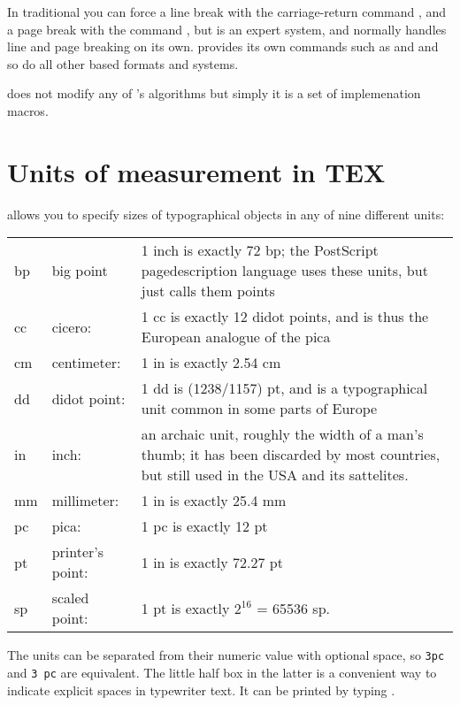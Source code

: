 In traditional \tex you  can force a line break with the carriage-return command ,
and a page break with the command , but \tex is an expert system,
and normally handles line and page breaking on its own. \latex provides its own commands such as \cmd{\clearpage} and \cmd{\newpage} and so do all other \tex based formats and systems.

\latex does not modify any of \tex's algorithms but simply it is a set of implemenation
macros.

\section{Units of measurement in TEX}

\tex allows you to specify sizes of typographical objects in any of nine different
units:


\begin{table}[htbp]
\begin{center}
\begin{tabular}{llp{5cm}}
\toprule
bp &big point &1 inch is exactly 72 bp; the PostScript pagedescription language uses these units, but just calls them points\\
cc &cicero: &1 cc is exactly 12 didot points, and is thus the European  analogue of the pica\\
cm &centimeter: &1 in is exactly 2.54 cm\\
dd &didot point: &1 dd is (1238/1157) pt, and is a typographical unit common in some parts of Europe\\
in &inch: &an archaic unit, roughly the width of a man's thumb; it has been discarded by most countries, but still used in the USA and its sattelites.\\
mm &millimeter: &1 in is exactly 25.4 mm\\
pc &pica: &1 pc is exactly 12 pt\\
pt &printer's point: &1 in is exactly 72.27 pt\\ 
sp &scaled point: &1 pt is exactly $2^{16}$ = 65536 sp.\\
\bottomrule
\end{tabular}
\end{center}
\end{table}



The units can be separated from their numeric value with optional space, so
\texttt{3pc} and \verb*+3 pc+ are equivalent. The little half box in the latter is a convenient
way to indicate explicit spaces in typewriter text. It can be printed by typing .

